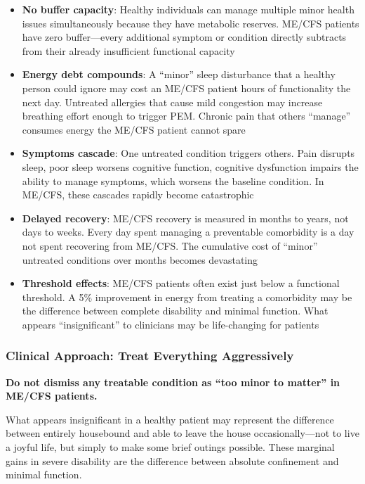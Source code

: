 \begin{itemize}
    \item \textbf{No buffer capacity}: Healthy individuals can manage multiple minor health issues simultaneously because they have metabolic reserves. ME/CFS patients have zero buffer---every additional symptom or condition directly subtracts from their already insufficient functional capacity

    \item \textbf{Energy debt compounds}: A ``minor'' sleep disturbance that a healthy person could ignore may cost an ME/CFS patient hours of functionality the next day. Untreated allergies that cause mild congestion may increase breathing effort enough to trigger PEM. Chronic pain that others ``manage'' consumes energy the ME/CFS patient cannot spare

    \item \textbf{Symptoms cascade}: One untreated condition triggers others. Pain disrupts sleep, poor sleep worsens cognitive function, cognitive dysfunction impairs the ability to manage symptoms, which worsens the baseline condition. In ME/CFS, these cascades rapidly become catastrophic

    \item \textbf{Delayed recovery}: ME/CFS recovery is measured in months to years, not days to weeks. Every day spent managing a preventable comorbidity is a day not spent recovering from ME/CFS. The cumulative cost of ``minor'' untreated conditions over months becomes devastating

    \item \textbf{Threshold effects}: ME/CFS patients often exist just below a functional threshold. A 5\% improvement in energy from treating a comorbidity may be the difference between complete disability and minimal function. What appears ``insignificant'' to clinicians may be life-changing for patients
\end{itemize}

\subsubsection{Clinical Approach: Treat Everything Aggressively}

\begin{tcolorbox}[colback=red!5!white,colframe=red!75!black,title=Clinical Imperative]
\textbf{Do not dismiss any treatable condition as ``too minor to matter'' in ME/CFS patients.}

What appears insignificant in a healthy patient may represent the difference between entirely housebound and able to leave the house occasionally---not to live a joyful life, but simply to make some brief outings possible. These marginal gains in severe disability are the difference between absolute confinement and minimal function.
\end{tcolorbox}

